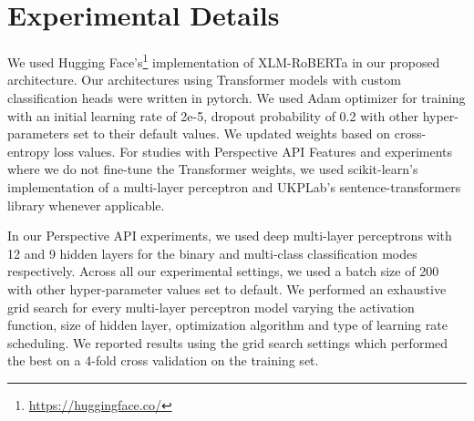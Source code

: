 \documentclass[
]{ceurart}
\begin{document}

\section{Experimental Details}
We used Hugging Face's\footnote{\url{https://huggingface.co/}} implementation of XLM-RoBERTa in our proposed architecture. Our architectures using Transformer models with custom classification heads were written in pytorch. We used Adam optimizer for training with an initial learning rate of 2e-5, dropout probability of 0.2 with other hyper-parameters set to their default values. We updated weights based on cross-entropy loss values. For studies with Perspective API Features and experiments where we do not fine-tune the Transformer weights, we used scikit-learn's\cite{scikit-learn} implementation of a multi-layer perceptron and UKPLab's sentence-transformers library whenever applicable.

In our Perspective API experiments, we used deep multi-layer perceptrons with 12 and 9 hidden layers for the binary and multi-class classification modes respectively. Across all our experimental settings, we used a batch size of 200 with other hyper-parameter values set to default. We performed an exhaustive grid search for every multi-layer perceptron model varying the activation function, size of hidden layer, optimization algorithm and type of learning rate scheduling. We reported results using the grid search settings which performed the best on a 4-fold cross validation on the training set. 
\end{document}
